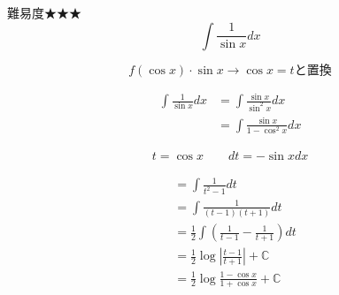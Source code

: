 \documentclass[main]{subfiles}
\begin{document}

\begin{mondai}{難易度★★★}{}
    $$\int \frac{1}{\sin x} dx$$
    
    \tcblower

    \begin{pointbox}
        \begin{center}
        $$f(\cos x)\cdot \sin x \rightarrow \cos x = t \text{と置換}$$
        \end{center}
    \end{pointbox}

    \begin{align*}
        \int \frac{1}{\sin x} dx
            &= \int \frac{\sin x}{\sin^2 x} dx \\
            &= \int \frac{\sin x}{1-\cos^2 x} dx
    \end{align*}
    \begin{tcolorbox}
        \begin{align*}
            t=\cos x \qquad 
            dt=-\sin x dx
        \end{align*}
    \end{tcolorbox}
    \begin{align*}
            &= \int \frac{1}{t^2-1} dt \\
            &= \int \frac{1}{(t-1)(t+1)} dt \\
            &= \frac{1}{2}\int \left(\frac{1}{t-1}-\frac{1}{t+1}\right) dt \\
            &= \frac{1}{2} \log \left|\frac{t-1}{t+1}\right|+\mathbb{C}  \\
            &= \frac{1}{2} \log \frac{1-\cos x}{1+\cos x}+\mathbb{C} \tag{答}
    \end{align*}

\end{mondai}
\end{document}

